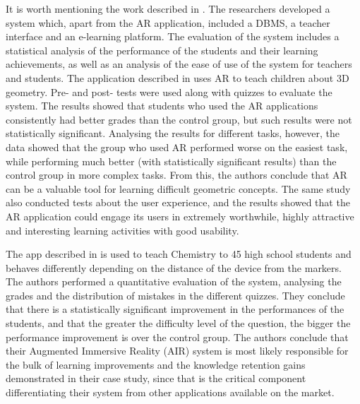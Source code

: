 \begin{table*}[ht!]
\begin{tabular}{>{\raggedright\arraybackslash}p{}p{}}
    \bottomrule
\end{tabular}
\end{table*}

%

It is worth mentioning the work described in \citep{chang2018impacts}. The researchers developed a system which, apart from the AR application, included a \gls{DBMS}, a teacher interface and an e-learning platform. The evaluation of the system includes a statistical analysis of the performance of the students and their learning achievements, as well as an analysis of the ease of use of the system for teachers and students. The application described in \cite{thamrongrat2019design} uses AR to teach children about 3D geometry. Pre- and post- tests were used along with quizzes to evaluate the system. The results showed that students who used the AR applications consistently had better grades than the control group, but such results were not statistically significant. Analysing the results for different tasks, however, the data showed that the group who used AR performed worse on the easiest task, while performing much better (with statistically significant results) than the control group in more complex tasks. From this, the authors conclude that AR can be a valuable tool for learning difficult geometric concepts. The same study also conducted tests about the user experience, and the results showed that the AR application could engage its users in extremely worthwhile, highly attractive and interesting learning activities with good usability.

The app described in \cite{cen2019augmented} is used to teach Chemistry to 45 high school students and behaves differently depending on the distance of the device from the markers. The authors performed a quantitative evaluation of the system, analysing the grades and the distribution of mistakes in the different quizzes. They conclude that there is a statistically significant improvement in the performances of the students, and that the greater the difficulty level of the question, the bigger the performance improvement is over the control group. The authors conclude that their Augmented Immersive Reality (AIR) system is most likely responsible for the bulk of learning improvements and the knowledge retention gains demonstrated in their case study, since that is the critical component differentiating their system from other applications available on the market.

